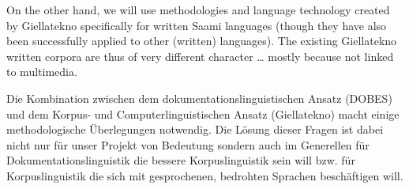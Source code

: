 \documentclass[a4paper,12pt]{article}
\begin{document}
On the other hand, we will use methodologies and language technology created by Giellatekno specifically for written Saami languages (though they have also been successfully applied to other (written) languages). The existing Giellatekno written corpora are thus of very different character … mostly because not linked to multimedia.

Die Kombination zwischen dem dokumentationslinguistischen Ansatz (DOBES) und dem Korpus- und Computerlinguistischen Ansatz (Giellatekno) macht einige methodologische Überlegungen notwendig. Die Lösung dieser Fragen ist dabei nicht nur für unser Projekt von Bedeutung sondern auch im Generellen für Dokumentationslinguistik die bessere Korpuslinguistik sein will bzw. für Korpuslinguistik die sich mit gesprochenen, bedrohten Sprachen beschäftigen will.
\end{document}
